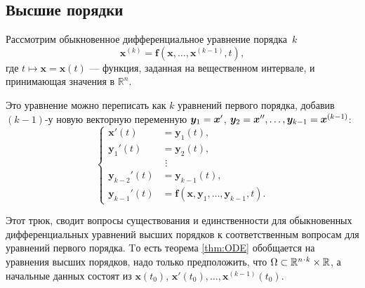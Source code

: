 \subsection*{Высшие порядки}

Рассмотрим обыкновенное дифференциальное уравнение порядка~$k$
\[\bm{x}^{(k)}=\bm{f}(\bm{x},\dots,\bm{x}^{(k-1)},t),\]
где $t\mapsto\bm{x}=\bm{x}(t)$ --- функция, заданная на вещественном интервале, и принимающая значения в $\mathbb{R}^n$.

Это уравнение можно переписать как $k$ уравнений первого порядка, добавив $(k-1)$-у новую векторную переменную
$\bm{y}_1\z=\bm{x}'$,
$\bm{y}_2\z=\bm{x}'',\z\dots,\bm{y}_{k-1}\z=\bm{x}^{(k-1)}$:
\[
\begin{cases}
\bm{x}'(t)&=\bm{y}_1(t),
\\
\bm{y}_1'(t)&=\bm{y}_2(t),
\\
&\,\,\vdots
\\
\bm{y}_{k-2}'(t)&=\bm{y}_{k-1}(t),
\\
\bm{y}_{k-1}'(t)&=\bm{f}(\bm{x},\bm{y}_{1},\dots,\bm{y}_{k-1},t).
\end{cases}
\]

Этот трюк, сводит вопросы существования и единственности для обыкновенных дифференциальных уравнений высших порядков к соответственным вопросам для уравнений первого порядка.
Tо есть теорема \ref{thm:ODE} обобщается на уравнения высших порядков, надо только предположить, что $\Omega\z\subset \mathbb{R}^{n\cdot k}\times \mathbb{R}$, а начальные данных состоят из $\bm{x}(t_0)$, $\bm{x}'(t_0),\dots,\bm{x}^{(k-1)}(t_0)$.

